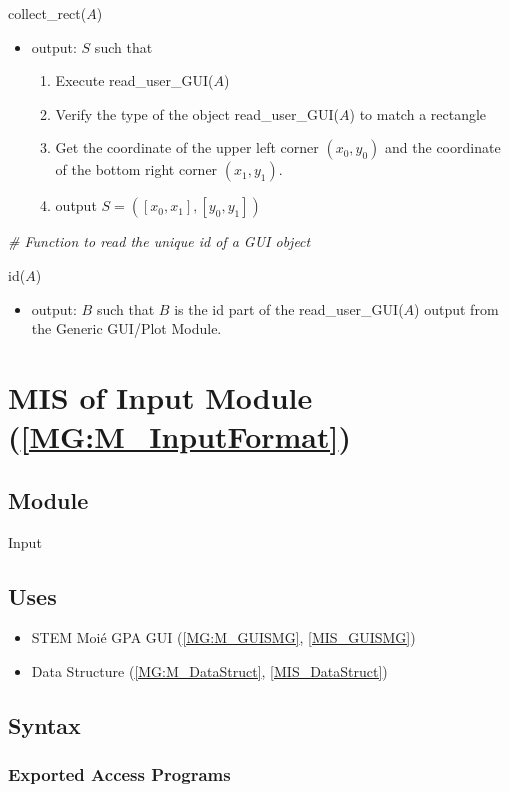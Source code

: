 \documentclass[12pt, titlepage]{article}
\begin{document}
\noindent collect{\_}rect($A$)
\begin{itemize}
\item output: $S$ such that
	\begin{enumerate}
	\item Execute read{\_}user{\_}GUI($A$)
	\item Verify the type of the object read{\_}user{\_}GUI($A$) to match a rectangle
	\item Get the coordinate of the upper left corner $(x_0,y_0)$ and the coordinate of the bottom right corner $(x_1,y_1)$. 
	\item output $S=([x_0,x_1],[y_0,y_1])$
	\end{enumerate} 
\end{itemize}
\bigskip

\noindent\textit{{\#} Function to read the unique id of a GUI object} \medskip

\noindent id($A$)
\begin{itemize}
\item output: $B$ such that $B$ is the id part of the read{\_}user{\_}GUI($A$) output from the Generic GUI/Plot Module.
\end{itemize}
\bigskip

\section{MIS of Input Module (\texorpdfstring{\cref{MG:M_InputFormat}}))} \label{MIS_Input}

\subsection{Module}
Input
\subsection{Uses}
\begin{itemize}
\item STEM Moi{\'e} GPA GUI (\cref{MG:M_GUISMG}, \cref{MIS_GUISMG})
\item Data Structure (\cref{MG:M_DataStruct}, \cref{MIS_DataStruct})
\end{itemize}

\subsection{Syntax}

\subsubsection{Exported Access Programs}
\end{document}
